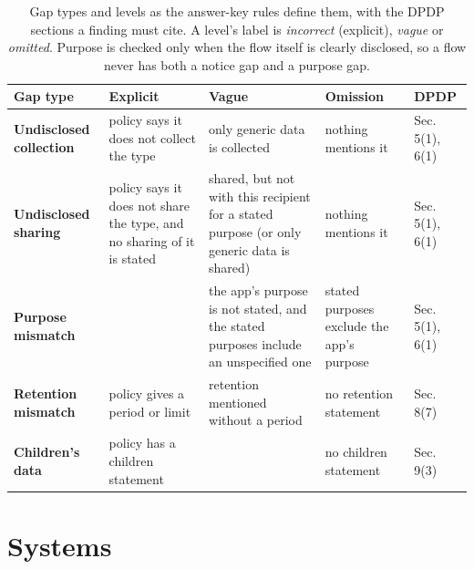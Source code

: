 \documentclass[11pt,a4paper]{article}
\newcommand{\rowline}{\specialrule{0.2pt}{3pt}{3pt}}
\begin{document}
\begin{table}[H]
\centering
\small
\begin{tabular}{L{2.5cm}L{3.3cm}L{3.5cm}L{2.7cm}L{2.0cm}}
\toprule
Gap type & Explicit & Vague & Omission & DPDP \\
\midrule
\textbf{Undisclosed collection} & policy says it does not collect the type & only generic data is
collected & nothing mentions it & Sec. 5(1), 6(1) \\ \rowline
\textbf{Undisclosed sharing} & policy says it does not share the type, and no sharing of it is
stated & shared, but not with this recipient for a stated purpose (or only generic data is
shared) & nothing mentions it & Sec. 5(1), 6(1) \\ \rowline
\textbf{Purpose mismatch} & & the app's purpose is not stated, and the stated purposes include an
unspecified one & stated purposes exclude the app's purpose & Sec. 5(1), 6(1) \\ \rowline
\textbf{Retention mismatch} & policy gives a period or limit & retention mentioned without a
period & no retention statement & Sec. 8(7) \\ \rowline
\textbf{Children's data} & policy has a children statement & & no children statement &
Sec. 9(3) \\
\bottomrule
\end{tabular}
\caption{Gap types and levels as the answer-key rules define them, with the DPDP sections a
finding must cite. A level's label is \emph{incorrect} (explicit), \emph{vague} or
\emph{omitted}. Purpose is checked only when the flow itself is clearly disclosed, so a flow never
has both a notice gap and a purpose gap.}
\end{table}

\section{Systems}
\end{document}
